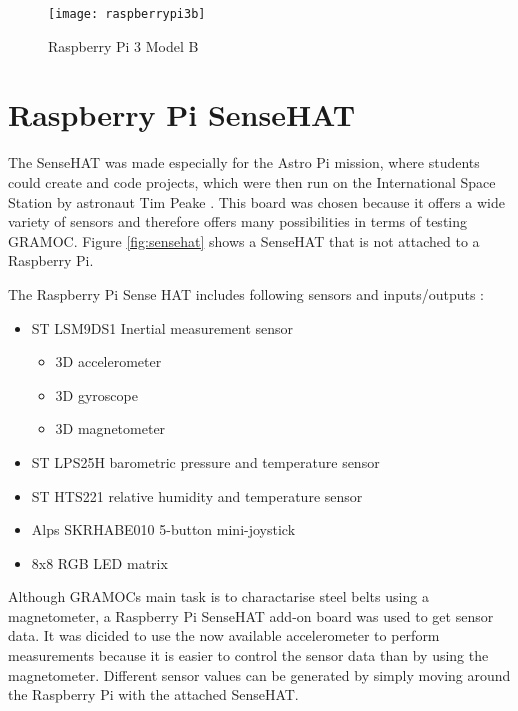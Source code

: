 \begin{figure}[H]
	\centering
	\texttt{[image: raspberrypi3b]}
	\caption[Raspberry Pi 3 Model B]{Raspberry Pi 3 Model B\footnotemark}
	\label{fig:raspberrypi3b}
\end{figure}


\section{Raspberry Pi SenseHAT}

The SenseHAT was made especially for the Astro Pi mission, where students could create and code projects, which were then run on the International Space Station by astronaut Tim Peake \autocite{AstroPiMission}. This board was chosen because it offers a wide variety of sensors and therefore offers many possibilities in terms of testing GRAMOC. Figure \vref{fig:sensehat} shows a SenseHAT that is not attached to a Raspberry Pi.

The Raspberry Pi Sense HAT includes following sensors and inputs/outputs \autocite{SenseHAT}:

\begin{minipage}{\textwidth}
\begin{itemize}
	\item ST LSM9DS1 Inertial measurement sensor
		\begin{itemize}
			\item 3D accelerometer
			\item 3D gyroscope
			\item 3D magnetometer
		\end{itemize}
	\item ST LPS25H barometric pressure and temperature sensor
	\item ST HTS221 relative humidity and temperature sensor
	\item Alps SKRHABE010 5-button mini-joystick
	\item 8x8 RGB LED matrix
\end{itemize}
\end{minipage}

Although GRAMOCs main task is to charactarise steel belts using a magnetometer, a Raspberry Pi SenseHAT add-on board was used to get sensor data. It was dicided to use the now available accelerometer to perform measurements because it is easier to control the sensor data than by using the magnetometer. Different sensor values can be generated by simply moving around the Raspberry Pi with the attached SenseHAT.

